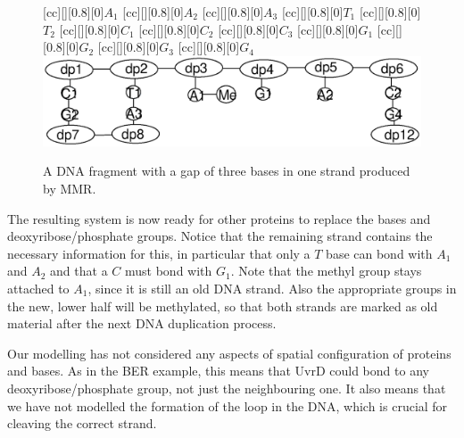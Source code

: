 \begin{figure}[]
[cc][][0.8][0]{${A_1}$}
[cc][][0.8][0]{${A_2}$}
[cc][][0.8][0]{${A_3}$}
[cc][][0.8][0]{${T_1}$}
[cc][][0.8][0]{${T_2}$}
[cc][][0.8][0]{${C_1}$}
[cc][][0.8][0]{${C_2}$}
[cc][][0.8][0]{${C_3}$}
[cc][][0.8][0]{${G_1}$}
[cc][][0.8][0]{${G_2}$}
[cc][][0.8][0]{${G_3}$}
[cc][][0.8][0]{${G_4}$}
  \centering
    \includegraphics[width=1.0\textwidth]{mmr/state7}\vspace{-1cm}
  \caption[A six base pair DNA fragment.]{A DNA fragment with a gap of three bases in one strand produced by MMR.}
  \label{fig:state7}
\end{figure}
The resulting system is now ready for other proteins to replace the bases and deoxyribose/phosphate groups. Notice that the remaining strand contains the necessary information for this, in particular that only a $T$ base can bond with $A_1$ and $A_2$ and that a $C$ must bond with $G_1$. Note that the methyl group stays attached to $A_1$, since it is still an old DNA strand. Also the appropriate groups in the new, lower half will be methylated, so that both strands are marked as old material after the next DNA duplication process.

Our modelling has not considered any aspects of spatial configuration of proteins and bases. As in the BER example,
this means that UvrD could bond to any deoxyribose/phosphate group, not just the neighbouring one. It also means that we have not modelled the formation of the loop in the DNA, which is crucial for cleaving the correct strand.


